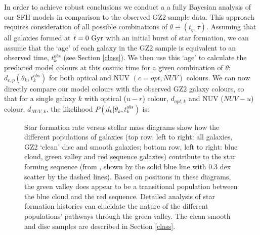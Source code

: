 \documentclass[useAMS,usenatbib]{mn2e}
\def\changed    {\color{titlecol} }
\begin{document}
In order to achieve robust conclusions we conduct a a fully Bayesian analysis \citep{Sivia, MacKay} of our SFH models in comparison to the observed GZ2 sample data. This approach requires consideration of all possible combinations of $\theta \equiv (t_{q}, \tau)$. Assuming that all galaxies formed at $t=0~\rm{Gyr}$ with an initial burst of star formation, we can assume that the `age' of each galaxy in the GZ2 sample is equivalent to an observed time, $t^{obs}_{k}$ (see Section \ref{class}). We then use this  `age' to calculate the predicted model colours at this cosmic time for a given combination of $\theta$: $d_{c,p}(\theta_k, t^{obs}_{k})$ for both optical and NUV $(c={opt,NUV})$ colours. We can now directly compare our model colours with the observed GZ2 galaxy colours, so that for a single galaxy $k$ with optical ($u-r$) colour, $d_{opt, k}$ and NUV ($NUV-u$) colour, $d_{NUV,k}$, the {\changed likelihood $P(d_{k}|\theta_k, t^{obs}_{k})$ is}:

\begin{figure}
\caption{Star formation rate versus stellar mass diagrams show how the different populations of galaxies  (top row, left to right: all galaxies, GZ2 `clean' disc and smooth galaxies; bottom row, left to right: blue cloud, green valley and red sequence galaxies) contribute to the star forming sequence (from \citet{Peng}, shown by the solid blue line with 0.3 dex scatter by the dashed lines). Based on positions in these diagrams, the green valley does appear to be a transitional population between the blue cloud and the red sequence. Detailed analysis of star formation histories can elucidate the nature of the different populations' pathways through the green valley. The clean smooth and disc samples are described in Section \ref{class}.}
\label{sfr_mass_sub}
\end{figure}
\end{document}
